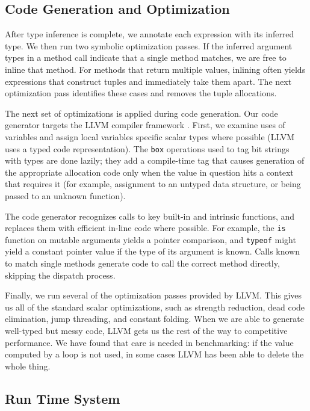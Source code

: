 \documentclass[9pt]{sigplanconf}
\begin{document}
\subsection{Code Generation and Optimization}

After type inference is complete, we annotate each expression with its
inferred type. We then run two symbolic optimization passes.
If the inferred argument types in a method call
indicate that a single method matches, we are free to inline that method.
For methods that return multiple values, inlining often yields
expressions that construct tuples and immediately take them apart. The
next optimization pass identifies these cases and removes the tuple
allocations.

The next set of optimizations is applied during code generation.
Our code generator targets the LLVM compiler framework \cite{LLVM}.
First, we examine uses of variables and assign local variables specific
scalar types where possible (LLVM uses a typed code representation).
The {\tt box} operations used to tag bit strings with types are done
lazily; they add a compile-time tag that causes generation of the
appropriate allocation code only when the value in question hits a context
that requires it (for example, assignment to an untyped data structure,
or being passed to an unknown function).

The code generator recognizes calls to key built-in and intrinsic functions,
and replaces them with efficient in-line code where possible. For example,
the {\tt is} function on mutable arguments yields a pointer comparison, and
{\tt typeof} might
yield a constant pointer value if the type of its argument is known.
Calls known to match single methods generate code to call the correct
method directly, skipping the dispatch process.

Finally, we run several of the optimization passes provided by LLVM.
This gives us all of the standard scalar optimizations, such as
strength reduction, dead code elimination, jump threading, and constant
folding. When
we are able to generate well-typed but messy code, LLVM gets us the
rest of the way to competitive performance. We have found that care
is needed in benchmarking: if the value computed by a loop is not
used, in some cases LLVM has been able to delete the whole thing.


\subsection{Run Time System}
\end{document}
